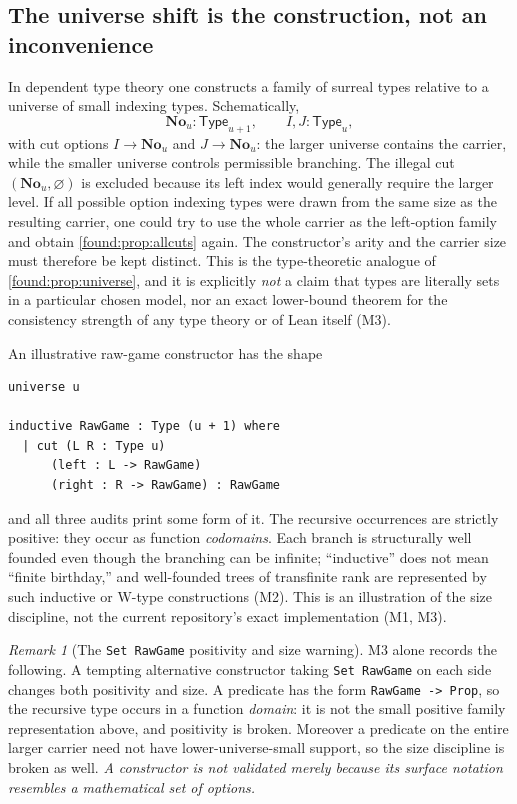 \documentclass[11pt,letterpaper]{article}
\numberwithin{equation}{section}
\theoremstyle{definition}
\theoremstyle{remark}
\newtheorem{remark}[theorem]{Remark}
\newcommand{\No}{\mathbf{No}}
\newcommand{\Type}{\mathsf{Type}}
\begin{document}
\subsection{The universe shift is the construction, not an inconvenience}
\label{found:sub:universeshift}
In dependent type theory one constructs a family of surreal types relative to a
universe of small indexing types. Schematically,
\[
 \No_u:\Type_{u+1},\qquad I,J:\Type_u,
\]
with cut options $I\to\No_u$ and $J\to\No_u$: the larger universe contains the
carrier, while the smaller universe controls permissible branching. The illegal
cut $(\No_u,\varnothing)$ is excluded because its left index would generally
require the larger level. If all possible option indexing types were drawn from
the same size as the resulting carrier, one could try to use the whole carrier
as the left-option family and obtain \cref{found:prop:allcuts} again. The
constructor's arity and the carrier size must therefore be kept distinct. This
is the type-theoretic analogue of \cref{found:prop:universe}, and it is
explicitly \emph{not} a claim that types are literally sets in a particular
chosen model, nor an exact lower-bound theorem for the consistency strength of
any type theory or of Lean itself (M3).

An illustrative raw-game constructor has the shape
\begin{samepage}
\begin{lstlisting}
universe u

inductive RawGame : Type (u + 1) where
  | cut (L R : Type u)
      (left : L -> RawGame)
      (right : R -> RawGame) : RawGame
\end{lstlisting}
\end{samepage}
and all three audits print some form of it. The recursive occurrences are
strictly positive: they occur as function \emph{codomains}. Each branch is
structurally well founded even though the branching can be infinite;
``inductive'' does not mean ``finite birthday,'' and well-founded trees of
transfinite rank are represented by such inductive or W-type constructions (M2).
This is an illustration of the size discipline, not the current repository's
exact implementation (M1, M3).

\begin{remark}[The \texttt{Set RawGame} positivity and size warning]\label{found:rem:setrawgame}
M3 alone records the following. A tempting alternative constructor taking
\texttt{Set RawGame} on each side changes both positivity and size. A predicate
has the form \texttt{RawGame -> Prop}, so the recursive type occurs in a
function \emph{domain}: it is not the small positive family representation
above, and positivity is broken. Moreover a predicate on the entire larger
carrier need not have lower-universe-small support, so the size discipline is
broken as well. \emph{A constructor is not validated merely because its surface
notation resembles a mathematical set of options.}
\end{remark}
\end{document}
